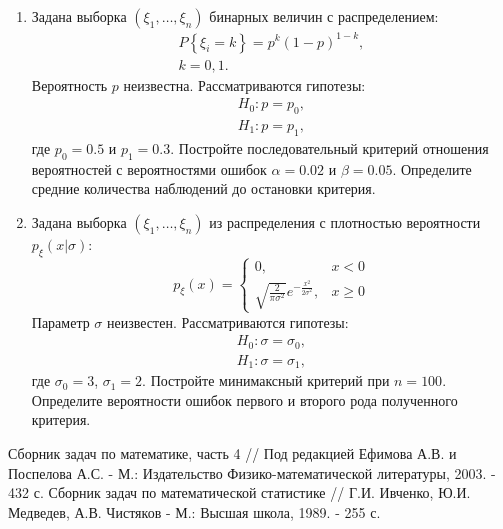 \documentclass[a4paper,12pt]{article}
\newcommand{\probability}[1]{P \left\{ #1 \right\}}
\begin{document}
\begin{enumerate}
      \item Задана выборка $\left( \xi_1, \dots, \xi_n \right)$ бинарных величин с распределением:
            \begin{gather*}
                  \probability{\xi_i = k} = p^k (1-p)^{1-k}, \\
                  k = 0,1.
            \end{gather*}
            Вероятность $p$ неизвестна. Рассматриваются гипотезы:
            \begin{gather*}
                  H_0: p = p_0 , \\
                  H_1: p = p_1 ,
            \end{gather*}
            где $p_0 = 0.5$ и $p_1 = 0.3$. Постройте последовательный критерий отношения вероятностей с вероятностями ошибок $\alpha = 0.02$ и
            $\beta = 0.05$. Определите средние количества наблюдений до остановки критерия.

      \item Задана выборка $\left( \xi_1, \dots, \xi_n \right)$ из распределения с плотностью вероятности $p_\xi(x | \sigma)$:
            \[
                  p_\xi(x) = \left \{
                  \begin{array}{ll}
                        0,                                                         & x < 0   \\
                        \sqrt{\frac{2}{\pi \sigma^2}} e^{-\frac{x^2}{2 \sigma^2}}, & x \ge 0
                  \end{array}
                  \right .
            \]
            Параметр $\sigma$ неизвестен. Рассматриваются гипотезы:
            \begin{gather*}
                  H_0: \sigma = \sigma_0 , \\
                  H_1: \sigma = \sigma_1 ,
            \end{gather*}
            где $\sigma_0 = 3$, $\sigma_1 = 2$. Постройте минимаксный критерий при $n = 100$. Определите вероятности ошибок первого и второго рода
            полученного критерия.
\end{enumerate}


\begin{thebibliography}{2}
       Сборник задач по математике, часть 4 // Под редакцией Ефимова А.В. и Поспелова А.С. - М.: Издательство Физико-математической
      литературы, 2003. - 432 с.
       Сборник задач по математической статистике // Г.И. Ивченко, Ю.И. Медведев, А.В. Чистяков - М.: Высшая школа, 1989. - 255 с.
\end{thebibliography}
\end{document}
